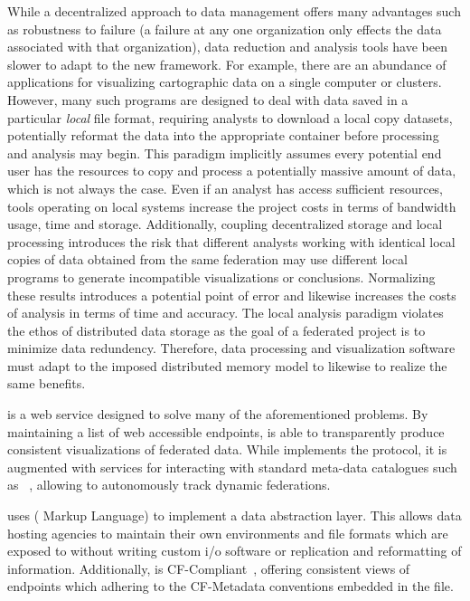 While a decentralized approach to data management offers many
advantages such as robustness to failure (a failure at any one
organization only effects the data associated with that organization),
data reduction and analysis tools have been slower to adapt to the new
framework. For example, there are an abundance of applications for
visualizing cartographic data on a single computer or
clusters. However, many such programs are designed to deal with data
saved in a particular \textit{local} file format, requiring analysts
to download a local copy datasets, potentially reformat the data into
the appropriate container before processing and analysis may
begin. This paradigm implicitly assumes every potential end user has
the resources to copy and process a potentially massive amount of
data, which is not always the case. Even if an analyst has access
sufficient resources, tools operating on local systems increase the
project costs in terms of bandwidth usage, time and
storage. Additionally, coupling decentralized storage and local
processing introduces the risk that different analysts working with
identical local copies of data obtained from the same federation may
use different local programs to generate incompatible visualizations
or conclusions. Normalizing these results introduces a potential point
of error and likewise increases the costs of analysis in terms of time
and accuracy. The local analysis paradigm violates the ethos of
distributed data storage as the goal of a federated project is to
minimize data redundency. Therefore, data processing and visualization
software must adapt to the imposed distributed memory model to
likewise to realize the same benefits.

\sciwms{} is a web service designed to solve many of the
aforementioned problems. By maintaining a list of web accessible
endpoints, \sciwms{} is able to transparently produce consistent
visualizations of federated data. While \sciwms{} implements the
\ogc{} \wms{} protocol, it is augmented with services for interacting
with standard meta-data catalogues such as \csw{}~\cite{csw14},
allowing \sciwms{} to autonomously track dynamic federations.

\sciwms{} uses \ncml{} (\netcdf{} Markup Language) to implement a data
abstraction layer. This allows data hosting agencies to maintain their
own environments and file formats which are exposed to \sciwms{}
without writing custom i/o software or replication and reformatting of
information. Additionally, \sciwms{} is CF-Compliant~\cite{cf},
offering consistent views of endpoints which adhering to the
CF-Metadata conventions embedded in the \ncml{} file.

